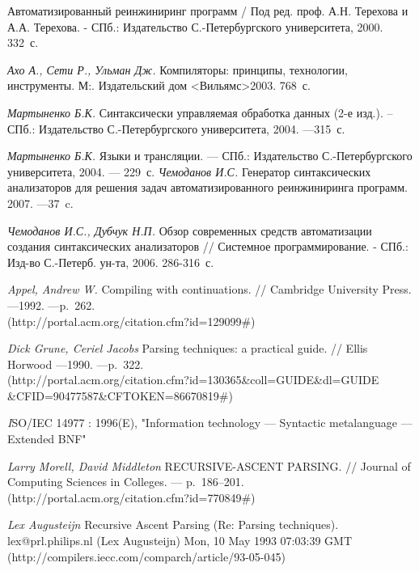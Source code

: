 \begin{thebibliography}{50}

         Автоматизированный реинжиниринг программ / Под ред. проф. А.Н. Терехова и А.А. Терехова. - СПб.: Издательство С.-Петербургского университета, 2000. 332~с.

         \emph {Ахо А., Сети Р., Ульман Дж.} Компиляторы: принципы, технологии, инструменты.  М:. Издательский дом <Вильямс>2003. 768~с.

        \emph {Мартыненко Б.К.} Синтаксически управляемая обработка данных (2-е изд.). -- СПб.: Издательство С.-Петербургского университета, 2004. ---315~с.

         \emph {Мартыненко Б.К.} Языки и трансляции. — СПб.: Издательство С.-Петербургского университета, 2004. --- 229~с.
         \emph{Чемоданов И.С.} Генератор синтаксических анализаторов  для решения задач автоматизированного реинжиниринга программ. 2007. ---37~c.        

         \emph{Чемоданов И.С., Дубчук Н.П.} Обзор современных средств автоматизации создания синтаксических анализаторов // Системное программирование. - СПб.: Изд-во С.-Петерб. ун-та, 2006. 286-316~с.


         \emph{Appel, Andrew W.} Compiling with continuations. // Cambridge University Press. ---1992. ---p.~262.
        \\(http://portal.acm.org/citation.cfm?id=129099\#)

         \emph{Dick Grune, Ceriel Jacobs} Parsing techniques: a practical guide. // Ellis Horwood ---1990. ---p.~322. 
         \\ (http://portal.acm.org/citation.cfm?id=130365\&coll=GUIDE\&dl=GUIDE\\\&CFID=90477587\&CFTOKEN=86670819\#)


         \emph ISO/IEC 14977 : 1996(E), "Information technology — Syntactic metalanguage — Extended BNF"

         \emph {Larry Morell, David Middleton} RECURSIVE-ASCENT PARSING. // Journal of Computing Sciences in Colleges. --- p.~186--201. 
        \\(http://portal.acm.org/citation.cfm?id=770849\#)

         \emph {Lex Augusteijn} Recursive Ascent Parsing (Re: Parsing techniques). lex@prl.philips.nl (Lex Augusteijn) Mon, 10 May 1993 07:03:39 GMT 
        \\(http://compilers.iecc.com/comparch/article/93-05-045)



\end{thebibliography}
